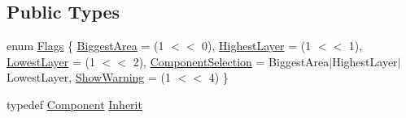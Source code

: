 \subsection*{Public Types}
\begin{DoxyCompactItemize}
\item 
enum \hyperlink{classHurricane_1_1RoutingPad_a69f37f0b06b9bfd758d9be42c71e2bd4}{Flags} \{ \newline
\hyperlink{classHurricane_1_1RoutingPad_a69f37f0b06b9bfd758d9be42c71e2bd4add72642d150e901835fa7d66d40e327d}{Biggest\+Area} = (1 $<$$<$ 0), 
\newline
\hyperlink{classHurricane_1_1RoutingPad_a69f37f0b06b9bfd758d9be42c71e2bd4a8f7993760a105713a97abdfb05eee852}{Highest\+Layer} = (1 $<$$<$ 1), 
\newline
\hyperlink{classHurricane_1_1RoutingPad_a69f37f0b06b9bfd758d9be42c71e2bd4a14c89f0c4ca6f4108b7f2ac30ab885a6}{Lowest\+Layer} = (1 $<$$<$ 2), 
\newline
\hyperlink{classHurricane_1_1RoutingPad_a69f37f0b06b9bfd758d9be42c71e2bd4aa2db526191b29a7e094bff309e27ef4c}{Component\+Selection} = Biggest\+Area$\vert$\+Highest\+Layer$\vert$\+Lowest\+Layer, 
\newline
\hyperlink{classHurricane_1_1RoutingPad_a69f37f0b06b9bfd758d9be42c71e2bd4a8fd74358022a29aab828700c8f7347ba}{Show\+Warning} = (1 $<$$<$ 4)
 \}
\item 
typedef \hyperlink{classHurricane_1_1Component}{Component} \hyperlink{classHurricane_1_1RoutingPad_a53bed3713fe846a351621d2022bc6b68}{Inherit}
\end{DoxyCompactItemize}
